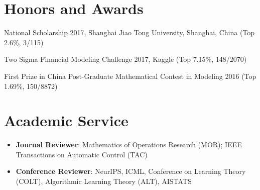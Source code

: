 \documentclass[letterpaper,10pt]{article}
\newcommand{\resumeItem}[2]{
  \item\small{
    \textbf{#1}{: #2 \vspace{-2pt}}
  }
}
\newcommand{\resumeSubItem}[2]{\resumeItem{#1}{#2}\vspace{-4pt}}
\newcommand{\resumeSubHeadingListStart}{\begin{itemize}[leftmargin=*]}
\newcommand{\resumeSubHeadingListEnd}{\end{itemize}}
\newcommand{\resumeItemListEnd}{\end{itemize}\vspace{-5pt}}
\begin{document}
    
        

    



\section{Honors and Awards}
\begin{description}[font=$\bullet$]
\item {National Scholarship 2017, Shanghai Jiao Tong University, Shanghai, China (Top 2.6\%, 3/115)}{}
\item {Two Sigma Financial Modeling Challenge 2017, Kaggle (Top 7.15\%, 148/2070)}
\item {First Prize in China Post-Graduate Mathematical Contest in Modeling 2016 (Top 1.69\%, 150/8872)}
\end{description}
\section{Academic Service}
	\resumeSubHeadingListStart
	\resumeSubItem{Journal Reviewer}{Mathematics of Operations Research (MOR); IEEE Transactions on Automatic Control (TAC)}
	\resumeSubItem{Conference Reviewer}{NeurIPS, ICML, Conference on Learning Theory (COLT), Algorithmic Learning Theory (ALT), AISTATS}
\resumeSubHeadingListEnd
\end{document}
